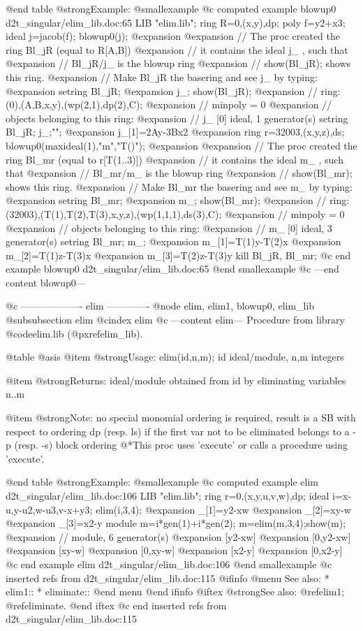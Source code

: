 @end table
@strong{Example:}
@smallexample
@c computed example blowup0 d2t_singular/elim_lib.doc:65 
LIB "elim.lib";
ring R=0,(x,y),dp;
poly f=y2+x3; ideal j=jacob(f);
blowup0(j);
@expansion{} 
@expansion{} // The proc created the ring Bl_jR (equal to R[A,B])
@expansion{} // it contains the ideal j_ , such that
@expansion{} //             Bl_jR/j_ is the blowup ring
@expansion{} // show(Bl_jR); shows this ring.
@expansion{} // Make Bl_jR the basering and see j_ by typing:
@expansion{}    setring Bl_jR;
@expansion{}    j_;
show(Bl_jR);
@expansion{} // ring: (0),(A,B,x,y),(wp(2,1),dp(2),C);
@expansion{} // minpoly = 0
@expansion{} // objects belonging to this ring:
@expansion{} // j_                   [0]  ideal, 1 generator(s)
setring Bl_jR;
j_;"";
@expansion{} j_[1]=2Ay-3Bx2
@expansion{} 
ring r=32003,(x,y,z),ds;
blowup0(maxideal(1),"m","T()");
@expansion{} 
@expansion{} // The proc created the ring Bl_mr (equal to r[T(1..3)])
@expansion{} // it contains the ideal m_ , such that
@expansion{} //             Bl_mr/m_ is the blowup ring
@expansion{} // show(Bl_mr); shows this ring.
@expansion{} // Make Bl_mr the basering and see m_ by typing:
@expansion{}    setring Bl_mr;
@expansion{}    m_;
show(Bl_mr);
@expansion{} // ring: (32003),(T(1),T(2),T(3),x,y,z),(wp(1,1,1),ds(3),C);
@expansion{} // minpoly = 0
@expansion{} // objects belonging to this ring:
@expansion{} // m_                   [0]  ideal, 3 generator(s)
setring Bl_mr;
m_;
@expansion{} m_[1]=T(1)y-T(2)x
@expansion{} m_[2]=T(1)z-T(3)x
@expansion{} m_[3]=T(2)z-T(3)y
kill Bl_jR, Bl_mr;
@c end example blowup0 d2t_singular/elim_lib.doc:65
@end smallexample
@c ---end content blowup0---

@c ------------------- elim -------------
@node elim, elim1, blowup0, elim_lib
@subsubsection elim
@cindex elim
@c ---content elim---
Procedure from library @code{elim.lib} (@pxref{elim_lib}).

@table @asis
@item @strong{Usage:}
elim(id,n,m); id ideal/module, n,m integers

@item @strong{Returns:}
ideal/module obtained from id by eliminating variables n..m

@item @strong{Note:}
no special monomial ordering is required, result is a SB with
respect to ordering dp (resp. ls) if the first var not to be
eliminated belongs to a -p (resp. -s) block ordering
@*This proc uses 'execute' or calls a procedure using 'execute'.

@end table
@strong{Example:}
@smallexample
@c computed example elim d2t_singular/elim_lib.doc:106 
LIB "elim.lib";
ring r=0,(x,y,u,v,w),dp;
ideal i=x-u,y-u2,w-u3,v-x+y3;
elim(i,3,4);
@expansion{} _[1]=y2-xw
@expansion{} _[2]=xy-w
@expansion{} _[3]=x2-y
module m=i*gen(1)+i*gen(2);
m=elim(m,3,4);show(m);
@expansion{} // module, 6 generator(s)
@expansion{} [y2-xw]
@expansion{} [0,y2-xw]
@expansion{} [xy-w]
@expansion{} [0,xy-w]
@expansion{} [x2-y]
@expansion{} [0,x2-y]
@c end example elim d2t_singular/elim_lib.doc:106
@end smallexample
@c inserted refs from d2t_singular/elim_lib.doc:115
@ifinfo
@menu
See also:
* elim1::
* eliminate::
@end menu
@end ifinfo
@iftex
@strong{See also:}
@ref{elim1};
@ref{eliminate}.
@end iftex
@c end inserted refs from d2t_singular/elim_lib.doc:115

